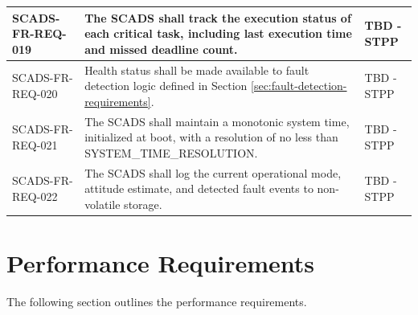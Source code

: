 \documentclass{article}
\begin{document}
\begin{longtable}{|l|p{9cm}|p{5cm}|}
                SCADS-FR-REQ-019 & The SCADS shall track the execution status of 
                                   each critical task, including last execution 
                                   time and missed deadline count.
                                 & TBD - STPP \\ \hline
                SCADS-FR-REQ-020 & Health status shall be made available to fault 
                                   detection logic defined in Section 
                                   \ref{sec:fault-detection-requirements}.
                                 & TBD - STPP \\ \hline
                SCADS-FR-REQ-021 & The SCADS shall maintain a monotonic system time, 
                                   initialized at boot, with a resolution of no 
                                   less than SYSTEM\_TIME\_RESOLUTION.
                                 & TBD - STPP \\ \hline
                SCADS-FR-REQ-022 & The SCADS shall log the current operational 
                                   mode, attitude estimate, and detected fault 
                                   events to non-volatile storage.
                                 & TBD - STPP \\ \hline
            \end{longtable}

    \section{Performance Requirements}\label{sec:performance-requirements}

        The following section outlines the performance requirements.
\end{document}
